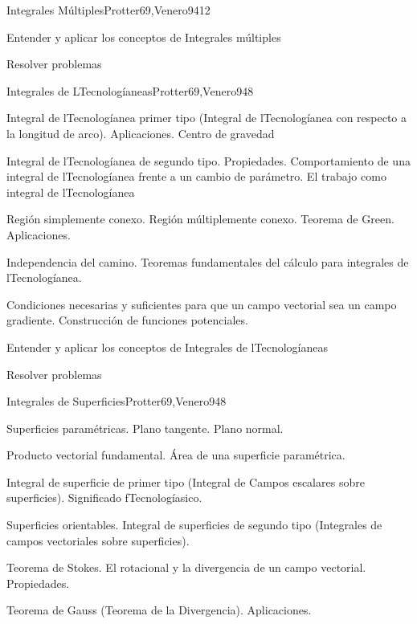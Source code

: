 \begin{syllabus}
\begin{unit}{Integrales Múltiples}{Protter69,Venero94}{12}
   \begin{unitgoals}
         \item  Entender y aplicar los conceptos de Integrales múltiples
         \item  Resolver problemas
   \end{unitgoals}
\end{unit}

\begin{unit}{Integrales de LTecnologíaneas}{Protter69,Venero94}{8}
   \begin{topics}
	\item  Integral de lTecnologíanea primer tipo (Integral de lTecnologíanea con respecto a la longitud de arco). Aplicaciones. Centro de gravedad
	\item  Integral de lTecnologíanea de segundo tipo. Propiedades. Comportamiento de una integral de lTecnologíanea frente a un cambio de parámetro. El trabajo como integral de lTecnologíanea
	\item  Región simplemente conexo. Región múltiplemente conexo. Teorema de Green. Aplicaciones.
	\item  Independencia del camino. Teoremas fundamentales del cálculo para integrales de lTecnologíanea.
	\item Condiciones necesarias y suficientes para que un campo vectorial sea un campo gradiente. Construcción de funciones potenciales.
   \end{topics}

   \begin{unitgoals}
         \item  Entender y aplicar los conceptos de Integrales de lTecnologíaneas
         \item  Resolver problemas
   \end{unitgoals}
\end{unit}

\begin{unit}{Integrales de Superficies}{Protter69,Venero94}{8}
   \begin{topics}
         \item  Superficies paramétricas. Plano tangente. Plano normal.
	 \item  Producto vectorial fundamental. Área de una superficie paramétrica.
         \item  Integral de superficie de primer tipo (Integral de Campos escalares sobre superficies). Significado fTecnologíasico.
	 \item  Superficies orientables. Integral de superficies de segundo tipo (Integrales de campos vectoriales sobre superficies).
         \item  Teorema de Stokes. El rotacional y la divergencia de un campo vectorial. Propiedades.
         \item  Teorema de Gauss (Teorema de la Divergencia). Aplicaciones.
   \end{topics}


\end{unit}
\end{syllabus}
